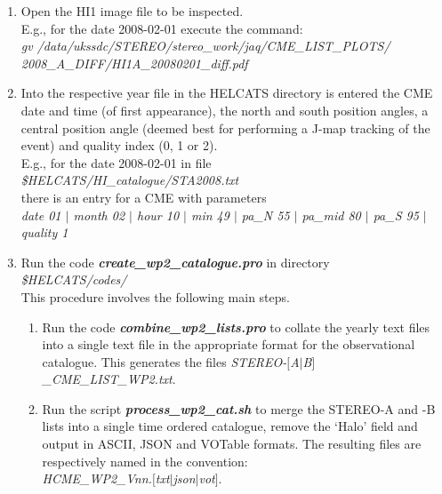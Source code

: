 \documentclass[12pt, a4paper, oneside]{article}
\begin{document}
\begin{enumerate}

\item Open the HI1 image file to be inspected. \\
E.g., for the date 2008-02-01 execute the command:\\
\textit{gv /data/ukssdc/STEREO/stereo\_work/jaq/CME\_LIST\_PLOTS/\\2008\_A\_DIFF/HI1A\_20080201\_diff.pdf}

\item Into the respective year file in the HELCATS directory is entered the CME date and time (of first appearance), the north and south position angles, a central position angle (deemed best for performing a J-map tracking of the event) and quality index (0, 1 or 2).\\
E.g., for the date 2008-02-01 in file \\
\textit{\$HELCATS/HI\_catalogue/STA2008.txt}\\
there is an entry for a CME with parameters\\
\textit{date 01 $|$ month 02 $|$ hour 10 $|$ min 49 $|$ pa\_N 55 $|$ pa\_mid 80 $|$ pa\_S 95 $|$ quality 1}

\item Run the code {\bf \textit{create\_wp2\_catalogue.pro}} in directory\\
	\textit{\$HELCATS/codes/} \\
	This procedure involves the following main steps.

	\begin{enumerate}
	\item Run the code {\bf \textit{combine\_wp2\_lists.pro}} to collate the yearly text files into a single text file in the appropriate format for the observational catalogue. This generates the files \textit{STEREO-$[$A$|$B$]$\_CME\_LIST\_WP2.txt}.

	\item Run the script {\bf \textit{process\_wp2\_cat.sh}} to merge the STEREO-A and -B lists into a single time ordered catalogue, remove the `Halo' field and output in ASCII, JSON and VOTable formats. The resulting files are respectively named in the convention:\\ \textit{HCME\_WP2\_Vnn.$[$txt$|$json$|$vot$]$}.

	\end{enumerate}
	
\end{enumerate}
\end{document}
